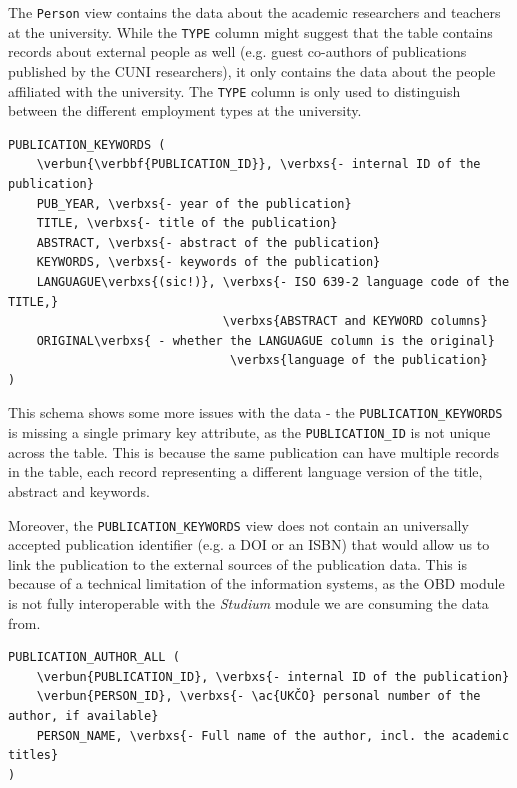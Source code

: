 The \texttt{Person} view contains the data about the academic researchers and teachers at the university.
While the \texttt{TYPE} column might suggest that the table contains records about external people as well (e.g. guest co-authors of publications published by the \ac{CUNI} researchers),
it only contains the data about the people affiliated with the university. The \texttt{TYPE} column is only used to distinguish between the different employment types at the university.

\begin{Verbatim}[commandchars=\\\{\}]
PUBLICATION_KEYWORDS (
    \verbun{\verbbf{PUBLICATION_ID}}, \verbxs{- internal ID of the publication}
    PUB_YEAR, \verbxs{- year of the publication}
    TITLE, \verbxs{- title of the publication}
    ABSTRACT, \verbxs{- abstract of the publication}
    KEYWORDS, \verbxs{- keywords of the publication}
    LANGUAGUE\verbxs{(sic!)}, \verbxs{- ISO 639-2 language code of the TITLE,}
                              \verbxs{ABSTRACT and KEYWORD columns}
    ORIGINAL\verbxs{ - whether the LANGUAGUE column is the original}
                               \verbxs{language of the publication}
)
\end{Verbatim}

This schema shows some more issues with the data - the \texttt{PUBLICATION\_KEYWORDS} is missing a single primary key attribute,
as the \texttt{PUBLICATION\_ID} is not unique across the table. This is because the same publication can have multiple records in the table,
each record representing a different language version of the title, abstract and keywords.

Moreover, the \texttt{PUBLICATION\_KEYWORDS} view does not contain an universally accepted publication identifier (e.g. a \ac{DOI} or an \ac{ISBN}) 
that would allow us to link the publication to the external sources of the publication data.
This is because of a technical limitation of the information systems, as the \ac{OBD} module is not fully interoperable with the \textit{Studium} module we are 
consuming the data from.

\label{sec:pub-author-all}
\begin{Verbatim}[commandchars=\\\{\}]
PUBLICATION_AUTHOR_ALL (
    \verbun{PUBLICATION_ID}, \verbxs{- internal ID of the publication}
    \verbun{PERSON_ID}, \verbxs{- \ac{UKČO} personal number of the author, if available}
    PERSON_NAME, \verbxs{- Full name of the author, incl. the academic titles}
)
\end{Verbatim}

